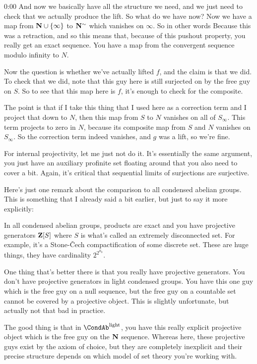\begin{unfinished}{0:00}
And now we basically have all the structure we need, and we just need to check that we actually produce the lift. So what do we have now? Now we have a map from $\mathbf N \cup \{\infty\}$ to $\mathbf N^\sim$ which vanishes on $\infty$. So in other words
Because this was a retraction, and so this means that, because of this pushout property, you really get an exact sequence. You have a map from the convergent sequence modulo infinity to $N$.

Now the question is whether we've actually lifted $f$, and the claim is that we did. To check that we did, note that this guy here is still surjected on by the free guy on $S$. So to see that this map here is $f$, it's enough to check for the composite.

The point is that if I take this thing that I used here as a correction term and I project that down to $N$, then this map from $S$ to $N$ vanishes on all of $S_\infty$. This term projects to zero in $N$, because its composite map from $S$ and $N$ vanishes on $S_\infty$. So the correction term indeed vanishes, and $g$ was a lift, so we're fine.

For internal projectivity, let me just not do it. It's essentially the same argument, you just have an auxiliary profinite set floating around that you also need to cover a bit. Again, it's critical that sequential limits of surjections are surjective.

Here's just one remark about the comparison to all condensed abelian groups. This is something that I already said a bit earlier, but just to say it more explicitly:

In all condensed abelian groups, products are exact and you have projective generators $\mathbf Z[S]$ where $S$ is what's called an extremely disconnected set. For example, it's a Stone-Čech compactification of some discrete set. These are huge things, they have cardinality $2^{2^{\aleph_0}}$.

One thing that's better there is that you really have projective generators. You don't have projective generators in light condensed groups. You have this one guy which is the free guy on a null sequence, but the free guy on a countable set cannot be covered by a projective object. This is slightly unfortunate, but actually not that bad in practice.

The good thing is that in $\CondAb^\light$, you have this really explicit projective object which is the free guy on the $\mathbf N$ sequence. Whereas here, these projective guys exist by the axiom of choice, but they are completely inexplicit and their precise structure depends on which model of set theory you're working with.


\end{unfinished}
